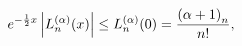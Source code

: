 \[e^{-\frac{1}{2}x}\left|\mathop{L^{(\alpha)}_{n}\/}\nolimits\!\left(x\right)%
\right|\leq\mathop{L^{(\alpha)}_{n}\/}\nolimits\!\left(0\right)=\frac{\left(%
\alpha+1\right)_{n}}{n!},\]
